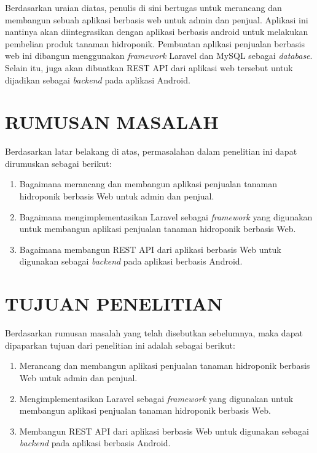 \par Berdasarkan uraian diatas, penulis di sini bertugas untuk merancang dan membangun sebuah aplikasi berbasis web untuk admin dan penjual. Aplikasi ini nantinya akan diintegrasikan dengan aplikasi berbasis android untuk melakukan pembelian produk tanaman hidroponik. Pembuatan aplikasi penjualan berbasis web ini dibangun menggunakan \textit{framework} Laravel dan MySQL sebagai \textit{database}. Selain itu, juga akan dibuatkan REST API dari aplikasi web tersebut untuk dijadikan sebagai \textit{backend} pada aplikasi Android.

\fancyhf{} 
\fancyfoot[R]{\thepage}

\section{\uppercase{RUMUSAN MASALAH}}
Berdasarkan latar belakang di atas, permasalahan dalam penelitian ini dapat dirumuskan sebagai berikut:
\begin{enumerate}
	\item Bagaimana merancang dan membangun aplikasi penjualan tanaman hidroponik berbasis Web untuk admin dan penjual.
	\item Bagaimana mengimplementasikan Laravel sebagai \textit{framework} yang digunakan untuk membangun aplikasi penjualan tanaman hidroponik berbasis Web.
	\item Bagaimana membangun REST API dari aplikasi berbasis Web untuk digunakan sebagai \textit{backend}  pada aplikasi berbasis Android.
\end{enumerate}

\section{\uppercase{TUJUAN PENELITIAN}}
Berdasarkan rumusan masalah yang telah disebutkan sebelumnya, maka dapat dipaparkan tujuan dari penelitian ini adalah sebagai berikut:
\begin{enumerate}
	\item Merancang dan membangun aplikasi penjualan tanaman hidroponik berbasis Web untuk admin dan penjual.
	\item Mengimplementasikan Laravel sebagai \textit{framework} yang digunakan untuk membangun aplikasi penjualan tanaman hidroponik berbasis Web.
	\item Membangun REST API dari aplikasi berbasis Web untuk digunakan sebagai \textit{backend} pada aplikasi berbasis Android.
\end{enumerate}


